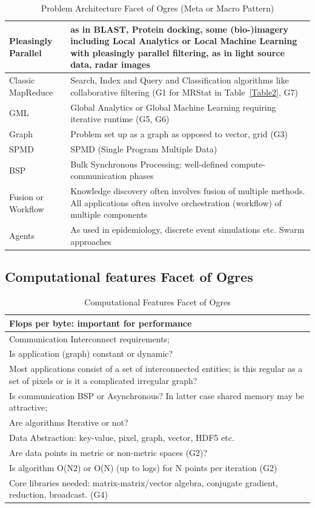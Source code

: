 \documentclass{acm_proc_article-sp}
\begin{document}
\begin{table}[t]
\centering
\caption{Problem Architecture Facet of Ogres (Meta or Macro Pattern)}
\label{Table6}
\begin{tabular}{|p{1.5cm}|p{5.75cm}|} \hline
Pleasingly Parallel & as in BLAST, Protein docking, some (bio-)imagery  including Local Analytics or Local Machine Learning with pleasingly parallel filtering, as in light source data, radar images \\ \hline 
Classic MapReduce & Search, Index and Query and Classification algorithms like collaborative filtering (G1 for MRStat in Table~\ref{Table2}, G7) \\ \hline
GML & Global Analytics or Global Machine Learning requiring iterative runtime (G5, G6) \\ \hline
Graph & Problem set up as a graph as opposed to vector, grid (G3) \\ \hline
SPMD & SPMD (Single Program Multiple Data) \\ \hline
BSP & Bulk Synchronous Processing: well-defined compute-communication phases \\ \hline
Fusion or Workflow & Knowledge discovery often involves fusion of multiple methods. All applications often involve orchestration (workflow) of multiple components \\ \hline
Agents & As used in epidemiology, discrete event simulations etc. Swarm approaches
\\ \hline
\end{tabular}
\end{table}


\subsection{Computational features Facet of Ogres}
\begin{table}
\centering
\caption{ Computational Features Facet of Ogres}
\label{Table7}
\begin{tabular}{|p{10cm}|} \hline
Flops per byte: important for performance \\ \hline
Communication Interconnect requirements; \\ \hline
Is application (graph) constant or dynamic? \\ \hline
Most applications consist of a set of interconnected entities; is this regular as a set of pixels or is it a complicated irregular graph? \\ \hline
Is communication BSP or Asynchronous? In latter case shared memory may be attractive;\\ \hline
Are algorithms Iterative or not?\\ \hline
Data Abstraction: key-value, pixel, graph, vector, HDF5 etc.\\ \hline
Are data points in metric or non-metric spaces (G2)? \\ \hline
Is algorithm O(N2) or O(N) (up to logs) for N points per iteration (G2)\\ \hline
Core libraries needed: matrix-matrix/vector algebra, conjugate gradient, reduction, broadcast. (G4)
\\ \hline
\end{tabular}
\end{table}
\end{document}
